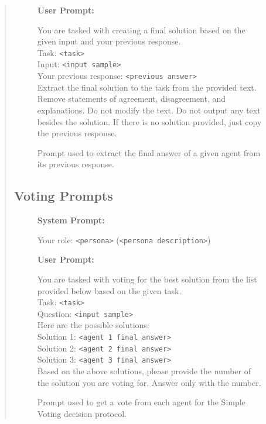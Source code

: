 \documentclass[11pt]{article}
\begin{document}
\begin{abstract}
\begin{figure}[H]
\begin{combinedprompt}
    \textbf{User Prompt:} \\
    \begingroup
    \colorbox{usercolor}{\parbox{\dimexpr\linewidth-2\fboxsep\relax}{
    You are tasked with creating a final solution based on the given input and your previous response.\\
    Task: \texttt{<task>}\\
    Input: \texttt{<input sample>}\\
    Your previous response: \texttt{<previous answer>}\\
    Extract the final solution to the task from the provided text. Remove statements of agreement, disagreement, and explanations. Do not modify the text. Do not output any text besides the solution. If there is no solution provided, just copy the previous response.
    }}
    \endgroup
\end{combinedprompt}
    \caption{Prompt used to extract the final answer of a given agent from its previous response.}
    \label{fig:extract_prompt}
\end{figure}

\subsection{Voting Prompts}
\label{app:voting_prompts}

\begin{figure}[H]
    \centering
    \begin{combinedprompt}
    \textbf{System Prompt:} \\
    \begingroup
    \colorbox{systemcolor}{\parbox{\dimexpr\linewidth-2\fboxsep\relax}{
    Your role: \texttt{<persona>} (\texttt{<persona description>})
    }}
    \endgroup

    \vspace{0.4em} %

    \textbf{User Prompt:} \\
    \begingroup
    \colorbox{usercolor}{\parbox{\dimexpr\linewidth-2\fboxsep\relax}{
    You are tasked with voting for the best solution from the list provided below based on the given task.\\
    Task: \texttt{<task>}\\
    Question: \texttt{<input sample>}\\
    Here are the possible solutions:\\
    Solution 1: \texttt{<agent 1 final answer>}\\
    Solution 2: \texttt{<agent 2 final answer>}\\
    Solution 3: \texttt{<agent 3 final answer>}\\
    Based on the above solutions, please provide the number of the solution you are voting for. Answer only with the number.
    }}
    \endgroup
\end{combinedprompt}
    \caption{Prompt used to get a vote from each agent for the Simple Voting decision protocol.}
    \label{fig:simple_voting_prompt}
\end{figure}


\end{abstract}
\end{document}
